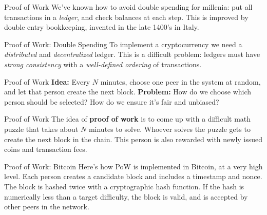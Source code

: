 \documentclass[14pt]{beamer}
\begin{document}
\begin{frame}{Proof of Work}
  We've known how to avoid double spending for millenia: put all transactions in
  a \emph{ledger}, and check balances at each step.
  \newline
  \newline
  This is improved by double entry bookkeeping, invented in the late 1400's in
  Italy.
\end{frame}

\begin{frame}{Proof of Work: Double Spending}
  To implement a cryptocurrency we need a \emph{distributed} and \emph{decentralized}
  ledger.
  \newline
  \newline
  This is a difficult problem: ledgers must  have \emph{strong consistency}
  with a \emph{well-defined ordering} of transactions.
\end{frame}

\begin{frame}{Proof of Work}
  \textbf{Idea:} Every $N$ minutes, choose one peer in the system at random, and
  let that person create the next block.
  \newline
  \newline
  \textbf{Problem:} How do we choose which person should be selected? How do we ensure it's fair and unbiased?
\end{frame}

\begin{frame}{Proof of Work}
  The idea of \textbf{proof of work} is to come up with a difficult math puzzle
  that takes about $N$ minutes to solve.
  \newline
  \newline
  Whoever solves the puzzle gets to create the next block in the chain.
  \newline
  \newline
  This person is also rewarded with newly issued coins and transaction fees.
\end{frame}

\begin{frame}{Proof of Work: Bitcoin}
  Here's how PoW is implemented in Bitcoin, at a very high level.
  \newline
  \newline
  Each person creates a candidate block and includes a timestamp and
  nonce. The block is hashed twice with a cryptographic hash
  function. If the hash is numerically less than a target difficulty,
  the block is valid, and is accepted by other peers in the network.
\end{frame}
\end{document}
